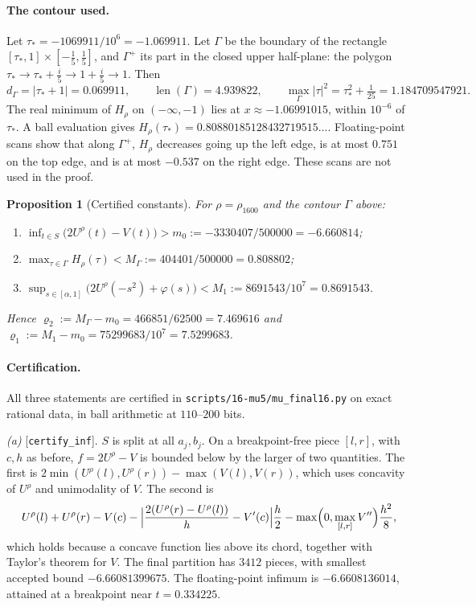 \documentclass[11pt]{article}
\newtheorem{proposition}{Proposition}
\theoremstyle{remark}
\newcommand{\file}[1]{\texttt{#1}}
\DeclareMathOperator{\len}{len}
\begin{document}
\paragraph{The contour used.} Let $\tau_*=-1069911/10^6=-1.069911$. Let $\Gamma$ be the boundary of the rectangle $[\tau_*,1]\times[-\frac15,\frac15]$, and $\Gamma^+$ its part in the closed upper half-plane: the polygon $\tau_*\to\tau_*+\frac i5\to1+\frac i5\to1$. Then
\[
d_\Gamma=|\tau_*+1|=0.069911,\qquad\len(\Gamma)=4.939822,\qquad\max_\Gamma|\tau|^2=\tau_*^2+\tfrac1{25}=1.184709547921 .
\]
The real minimum of $H_\rho$ on $(-\infty,-1)$ lies at $x\approx-1.06991015$, within $10^{-6}$ of $\tau_*$. A ball evaluation gives $H_\rho(\tau_*)=0.80880185128432719515\ldots$. Floating-point scans show that along $\Gamma^+$, $H_\rho$ decreases going up the left edge, is at most $0.751$ on the top edge, and is at most $-0.537$ on the right edge. These scans are not used in the proof.

\begin{proposition}[Certified constants]\label{prop:normcert}
For $\rho=\rho_{1600}$ and the contour $\Gamma$ above:
\begin{enumerate}[label=(\alph*)]
\item $\inf_{t\in S}\bigl(2U^\rho(t)-V(t)\bigr)>m_0:=-3330407/500000=-6.660814$;
\item $\max_{\tau\in\Gamma}H_\rho(\tau)<M_\Gamma:=404401/500000=0.808802$;
\item $\sup_{s\in[\alpha,1]}\bigl(2U^\rho(-s^2)+\varphi(s)\bigr)<M_1:=8691543/10^7=0.8691543$.
\end{enumerate}
Hence $\varrho_2:=M_\Gamma-m_0=466851/62500=7.469616$ and $\varrho_1:=M_1-m_0=75299683/10^7=7.5299683$.
\end{proposition}

\paragraph{Certification.} All three statements are certified in \file{scripts/16-mu5/mu\_final16.py} on exact rational data, in ball arithmetic at $110$--$200$ bits.

\emph{(a)} [\file{certify\_inf}]. $S$ is split at all $a_j,b_j$. On a breakpoint-free piece $[l,r]$, with $c,h$ as before, $f=2U^\rho-V$ is bounded below by the larger of two quantities. The first is $2\min(U^\rho(l),U^\rho(r))-\max(V(l),V(r))$, which uses concavity of $U^\rho$ and unimodality of $V$. The second is
\[
U^\rho(l)+U^\rho(r)-V(c)-\Bigl|\frac{2(U^\rho(r)-U^\rho(l))}{h}-V'(c)\Bigr|\frac h2-\max\Bigl(0,\max_{[l,r]}V''\Bigr)\frac{h^2}8 ,
\]
which holds because a concave function lies above its chord, together with Taylor's theorem for $V$. The final partition has $3412$ pieces, with smallest accepted bound $-6.66081399675$. The floating-point infimum is $-6.6608136014$, attained at a breakpoint near $t=0.334225$.
\end{document}
